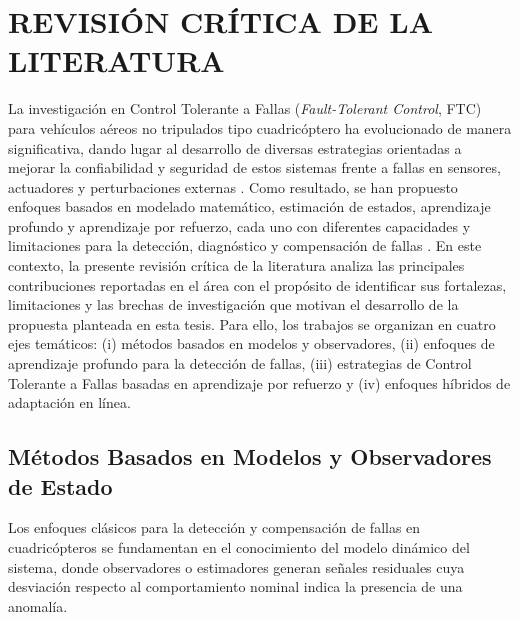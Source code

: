 \chapter{REVISIÓN CRÍTICA DE LA LITERATURA}

La investigación en Control Tolerante a Fallas (\textit{Fault-Tolerant Control}, FTC) para vehículos aéreos no tripulados tipo cuadricóptero ha evolucionado de manera significativa, dando lugar al desarrollo de diversas estrategias orientadas a mejorar la confiabilidad y seguridad de estos sistemas frente a fallas en sensores, actuadores y perturbaciones externas \cite{freddi2019,fdd2021survey,quadcopter2024}. Como resultado, se han propuesto enfoques basados en modelado matemático, estimación de estados, aprendizaje profundo y aprendizaje por refuerzo, cada uno con diferentes capacidades y limitaciones para la detección, diagnóstico y compensación de fallas \cite{fdd2021survey,quadcopter2024,ozcan2024,liu2024,kim2025}. En este contexto, la presente revisión crítica de la literatura analiza las principales contribuciones reportadas en el área con el propósito de identificar sus fortalezas, limitaciones y las brechas de investigación que motivan el desarrollo de la propuesta planteada en esta tesis. Para ello, los trabajos se organizan en cuatro ejes temáticos: (i) métodos basados en modelos y observadores, (ii) enfoques de aprendizaje profundo para la detección de fallas, (iii) estrategias de Control Tolerante a Fallas basadas en aprendizaje por refuerzo y (iv) enfoques híbridos de adaptación en línea.


\section{Métodos Basados en Modelos y Observadores de Estado}


\noindent Los enfoques clásicos para la detección y compensación de fallas en cuadricópteros se fundamentan en el conocimiento del modelo dinámico del sistema, donde observadores o estimadores generan señales residuales cuya desviación respecto al comportamiento nominal indica la presencia de una anomalía.

